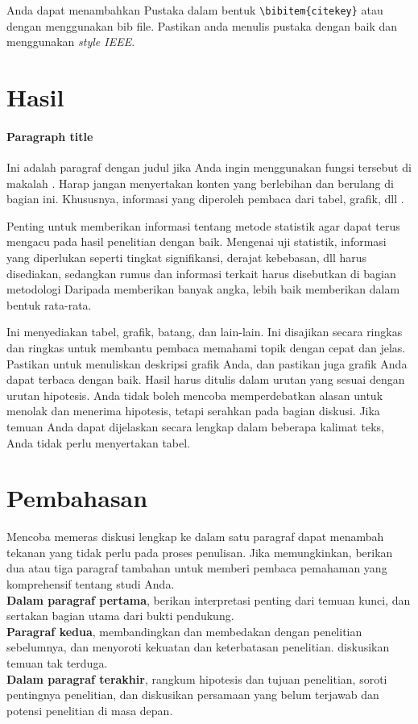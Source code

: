 \documentclass[
 manuscript=article,  %
  layout=publish, 
  year=2024, 
  month= Februari, %
  volume=8,
  number=1 
]{JIKO}
\begin{document}
	Anda dapat menambahkan Pustaka dalam bentuk \verb|\bibitem{citekey}| atau dengan menggunakan bib file. Pastikan anda menulis pustaka dengan baik dan menggunakan \textit{style IEEE}.

\section{Hasil}

\paragraph{Paragraph title} Ini adalah paragraf dengan judul jika Anda ingin menggunakan fungsi tersebut di makalah \cite{Barden2000,Johnson1962,Kolodzy}. Harap jangan menyertakan konten yang berlebihan dan berulang di bagian ini. Khususnya, informasi yang diperoleh pembaca dari tabel, grafik, dll \cite{Rikie}.

Penting untuk memberikan informasi tentang metode statistik agar  dapat terus mengacu pada hasil penelitian dengan baik.
Mengenai uji statistik, informasi yang diperlukan seperti tingkat signifikansi, derajat kebebasan, dll harus disediakan, sedangkan rumus dan informasi terkait harus disebutkan di bagian metodologi\cite{Lutfiyana2017,Pramana2013,Wu}
Daripada memberikan banyak angka, lebih baik memberikan dalam bentuk rata-rata.

Ini menyediakan tabel, grafik, batang, dan lain-lain. Ini disajikan secara ringkas dan ringkas untuk membantu pembaca memahami topik dengan cepat dan jelas. Pastikan untuk menuliskan deskripsi grafik Anda, dan pastikan juga grafik Anda dapat terbaca dengan baik.
Hasil harus ditulis dalam urutan yang sesuai dengan urutan hipotesis.
Anda tidak boleh mencoba memperdebatkan alasan untuk menolak dan menerima hipotesis, tetapi serahkan pada bagian diskusi.
Jika temuan Anda dapat dijelaskan secara lengkap dalam beberapa kalimat teks, Anda tidak perlu menyertakan tabel.
 


\section{Pembahasan}

Mencoba memeras diskusi lengkap ke dalam satu paragraf dapat menambah tekanan yang tidak perlu pada proses penulisan. Jika memungkinkan, berikan dua atau tiga paragraf tambahan untuk memberi pembaca pemahaman yang komprehensif tentang studi Anda.\\
\textbf{Dalam paragraf pertama}, berikan interpretasi penting dari temuan kunci, dan sertakan bagian utama dari bukti pendukung.\\
\textbf{Paragraf kedua}, membandingkan dan membedakan dengan penelitian sebelumnya, dan menyoroti kekuatan dan keterbatasan penelitian. diskusikan temuan tak terduga.\\
\textbf{Dalam paragraf terakhir}, rangkum hipotesis dan tujuan penelitian, soroti pentingnya penelitian, dan diskusikan persamaan yang belum terjawab dan potensi penelitian di masa depan.
\end{document}
